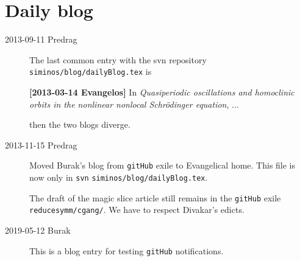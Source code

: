 
\chapter{Daily blog}
\label{c-DailyBlog}


\begin{description}
\item[2013-09-11  Predrag] The last common entry with the svn repository
\\    \texttt{siminos/blog/dailyBlog.tex} is

{\bf [2013-03-14 Evangelos]} In
\emph{Quasiperiodic oscillations and homoclinic orbits in the nonlinear nonlocal
Schr\"odinger equation}, ...

then the two blogs diverge.

\item[2013-11-15  Predrag] Moved Burak's blog from \texttt{gitHub} exile
to Evangelical home. This file is now only in \texttt{svn}
 \texttt{siminos/blog/dailyBlog.tex}.

The draft of the magic slice article still remains in the
 \texttt{gitHub} exile \texttt{reducesymm/cgang/}. We have to respect Divakar's edicts.

\item[2019-05-12 Burak] This is a blog entry for testing \texttt{gitHub} 
notifications.

\end{description}

